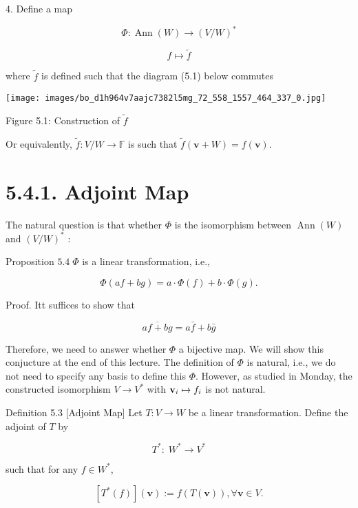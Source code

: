 \documentclass[11pt]{article}
\begin{document}
4. Define a map

\[
\Phi  : \operatorname{Ann}\left( W\right)  \rightarrow  {\left( V/W\right) }^{ * }
\]

\[
f \mapsto  \widetilde{f}
\]

where \(\widetilde{f}\) is defined such that the diagram (5.1) below commutes

\begin{center}
\texttt{[image: images/bo\_d1h964v7aajc7382l5mg\_72\_558\_1557\_464\_337\_0.jpg]}
\end{center}
\hspace*{3em} 

Figure 5.1: Construction of \(\widetilde{f}\)

Or equivalently, \(\widetilde{f} : V/W \rightarrow  \mathbb{F}\) is such that \(\widetilde{f}\left( {\mathbf{v} + W}\right)  = f\left( \mathbf{v}\right)\).

\section*{5.4.1. Adjoint Map}

The natural question is that whether \(\Phi\) is the isomorphism between \(\operatorname{Ann}\left( W\right)\) and \({\left( V/W\right) }^{ * }\) :

Proposition \({5.4}\;\Phi\) is a linear transformation, i.e.,

\[
\Phi \left( {{af} + {bg}}\right)  = a \cdot  \Phi \left( f\right)  + b \cdot  \Phi \left( g\right) .
\]

Proof. Itt suffices to show that

\[
\overline{{af} + {bg}} = a\bar{f} + b\bar{g}
\]

Therefore, we need to answer whether \(\Phi\) a bijective map. We will show this conjucture at the end of this lecture. The definition of \(\Phi\) is natural, i.e., we do not need to specify any basis to define this \(\Phi\). However, as studied in Monday, the constructed isomorphism \(V \rightarrow  {V}^{ * }\) with \({\bf v}_{i} \mapsto  {f}_{i}\) is not natural.

Definition 5.3 [Adjoint Map] Let \(T : V \rightarrow  W\) be a linear transformation. Define the adjoint of \(T\) by

\[
{T}^{ * } : \;{W}^{ * } \rightarrow  {V}^{ * }
\]

such that for any \(f \in  {W}^{ * }\),

\[
\left\lbrack  {{T}^{ * }\left( f\right) }\right\rbrack  \left( \mathbf{v}\right)  \mathrel{\text{ := }} f\left( {T\left( \mathbf{v}\right) }\right) ,\forall \mathbf{v} \in  V.
\]
\end{document}
